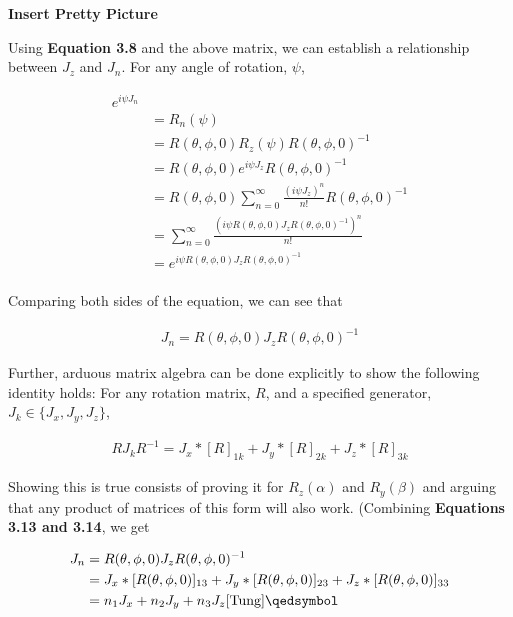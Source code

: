 \documentclass[10pt]{ucthesis}
\begin{document}
\textbf{Insert Pretty Picture}

Using \textbf{Equation 3.8} and the above matrix, we can establish a relationship between $J_z$ and $J_n$. For any angle of rotation, $\psi$,

\begin{equation}
	\begin{aligned}
		e^{i\psi J_n} \\
							&= R_n(\psi)	\\
							&=R(\theta,\phi,0)R_z(\psi)R(\theta,\phi,0)^{-1}\\
							&=R(\theta,\phi,0) e^{i\psi J_z} R(\theta,\phi,0)^{-1}\\ 
							&= R(\theta,\phi,0) \sum_{n=0}^\infty \frac{(i\psi J_z)^n}{n!} R(\theta,\phi,0)^{-1} \\
							&= \sum_{n=0}^\infty \frac{(i\psi R(\theta,\phi,0)J_zR(\theta,\phi,0)^{-1})^n}{n!} \\
							&= e^{i\psi R(\theta,\phi,0)J_z R(\theta,\phi,0)^{-1}}\\
	\end{aligned}
\end{equation}

Comparing both sides of the equation, we can see that 

\begin{equation}
	\begin{aligned}
		J_n = R(\theta,\phi,0)J_z R(\theta,\phi,0)^{-1}
	\end{aligned}
\end{equation}

Further, arduous matrix algebra can be done explicitly to show the following identity holds: For any rotation matrix, $R$, and a specified generator, $J_k\in\{J_x,J_y,J_z\}$,

\begin{equation}
	\begin{aligned}
		RJ_kR^{-1} = J_x * [R]_{1k} + J_y * [R]_{2k}  +J_z * [R]_{3k} 
	\end{aligned}
\end{equation}

Showing this is true consists of proving it for $R_z(\alpha)$ and $R_y(\beta)$ and arguing that any product of matrices of this form will also work. (Combining \textbf{Equations 3.13 and 3.14}, we get 

\begin{equation}
	\begin{aligned}
		J_n &= R(\theta,\phi,0)J_z R(\theta,\phi,0)^{-1} \\
			&= J_x * [R(\theta,\phi,0)]_{13} + J_y * [R(\theta,\phi,0)]_{23}  +J_z * [R(\theta,\phi,0)]_{33}\\
			 &= n_1J_x + n_2J_y + n_3J_z \cite{Tung} \qedsymbol
	\end{aligned}
\end{equation} 
\end{document}
